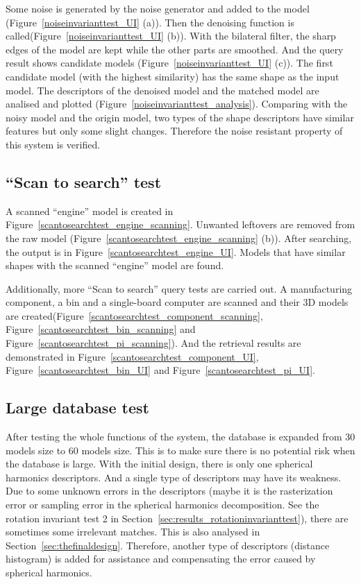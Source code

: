 Some noise is generated by the noise generator and added to the model (Figure~\ref{noiseinvarianttest_UI} (a)). Then the denoising function is called(Figure~\ref{noiseinvarianttest_UI} (b)). With the bilateral filter, the sharp edges of the model are kept while the other parts are smoothed. And the query result shows candidate models (Figure~\ref{noiseinvarianttest_UI} (c)). The first candidate model (with the highest similarity) has the same shape as the input model. The descriptors of the denoised model and the matched model are　analised and plotted (Figure~\ref{noiseinvarianttest_analysis}). Comparing with the noisy model and the origin model, two types of the shape descriptors have similar features but only some slight changes. Therefore the noise resistant property of this system is verified. 

\subsection{``Scan to search'' test}

A scanned ``engine'' model is created in Figure~\ref{scantosearchtest_engine_scanning}. Unwanted leftovers are removed from the raw model (Figure~\ref{scantosearchtest_engine_scanning} (b)). 
After searching, the output is in Figure~\ref{scantosearchtest_engine_UI}. Models that have similar shapes with the scanned ``engine'' model are found. 

Additionally, more ``Scan to search'' query tests are carried out. A manufacturing component, a bin and a single-board computer are scanned and their 3D models are created(Figure~\ref{scantosearchtest_component_scanning}, Figure~\ref{scantosearchtest_bin_scanning} and Figure~\ref{scantosearchtest_pi_scanning}). And the retrieval results are demonstrated in Figure~\ref{scantosearchtest_component_UI}, Figure~\ref{scantosearchtest_bin_UI} and Figure~\ref{scantosearchtest_pi_UI}.

\subsection{Large database test}

After testing the whole functions of the system, the database is expanded from 30 models size to 60 models size. This is to make sure there is no potential risk when the database is large. With the initial design, there is only one spherical harmonics descriptors. And a single type of descriptors may have its weakness. Due to some unknown errors in the descriptors (maybe it is the rasterization error or sampling error in the spherical harmonics decomposition. See the rotation invariant test 2 in Section~\ref{sec:results_rotationinvarianttest}), there are sometimes some irrelevant matches. This is also analysed in Section~\ref{sec:thefinaldesign}.  Therefore, another type of descriptors (distance histogram) is added for assistance and compensating the error caused by spherical harmonics. 

